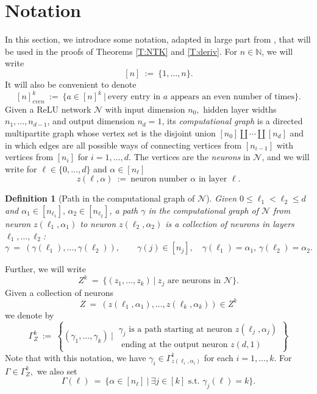 \documentclass[11pt, reqno]{amsart}
\newtheorem{definition}{Definition}
\newcommand{\N}{{\mathbb N}}
\newcommand{\lr}[1]{\ensuremath{\left(#1 \right)}}
\newcommand{\set}[1]{\ensuremath{\{#1\}}}
\newcommand{\mN}{\mathcal N}
\begin{document}
\section{Notation}\label{S:notation} In this section, we introduce some notation, adapted in large part from \cite{hanin2018products}, that will be used in the proofs of Theorems \ref{T:NTK} and \ref{T:deriv}. For $n\in \N$, we will write
\[[n]~:=~\set{1,\ldots, n}.\]
It will also be convenient to denote 
\[[n]_{even}^k~:=~\set{a\in [n]^k~|~\text{every entry in }a\text{ appears an even number of times}}.\]
Given a ReLU network $\mN$ with input dimension $n_0,$ hidden layer widths $n_1,\ldots, n_{d-1}$, and output dimension $n_d=1$, its \textit{computational graph} is a directed multipartite graph whose vertex set is the disjoint union $[n_0]\coprod \cdots \coprod [n_d]$ and in which edges are all possible ways of connecting vertices from $[n_{i-1}]$ with vertices from $[n_i]$ for $i=1,\ldots, d.$ The vertices are the \textit{neurons} in $\mN$, and we will write for $\ell\in \set{0,\ldots, d}$ and $\alpha \in [n_\ell]$
\begin{equation}
    z(\ell, \alpha)~:=~\text{neuron number }\alpha\text{ in layer }\ell. 
\end{equation}
\begin{definition}[Path in the computational graph of $\mN$]
Given $0\leq \ell_1<\ell_2\leq d$ and $\alpha_1\in[n_{\ell_1}], \, \alpha_2\in [n_{\ell_2}]$, a  \textit{path} $\gamma$ in the computational graph of $\mN$ from neuron $z(\ell_1, \alpha_1)$ to neuron $z(\ell_2, \alpha_2)$ is a collection of neurons in layers $\ell_1,\ldots, \ell_2$:
\begin{equation}\label{E:gamma-def}
\gamma~=~\lr{\gamma(\ell_1),\ldots, \gamma(\ell_2)},\qquad \gamma(j)\in [n_j],\quad \gamma(\ell_1)=\alpha_1,\, \gamma(\ell_2)=\alpha_2.
\end{equation}
\end{definition} 
\noindent Further, we will write
\[Z^k~=~\set{(z_1,\ldots, z_k)~|~ z_j\text{ are neurons in }\mN}.\]
Given a collection of neurons 
\[
Z~=~\lr{z(\ell_1, \alpha_1),\ldots, z(\ell_k,\alpha_k)}\in Z^k
\]
we denote by 
\[\Gamma_Z^k~:=~\left\{\lr{\gamma_1,\ldots, \gamma_k}~\big|~\substack{\gamma_j\text{ is a path starting at neuron }z(\ell_j,\alpha_j)\\\text{ ending at the output neuron }z(d,1)}\right\}\]
Note that with this notation, we have $\gamma_i \in \Gamma_{z(\ell_i,\alpha_i)}^1$ for each $i=1,\ldots,k$. For $\Gamma\in \Gamma_Z^k,$ we also set
\[\Gamma(\ell)~=~\set{\alpha\in [n_\ell]~|~\exists j\in [k]\text{ s.t. } \gamma_j(\ell)=k}.\]
\end{document}
